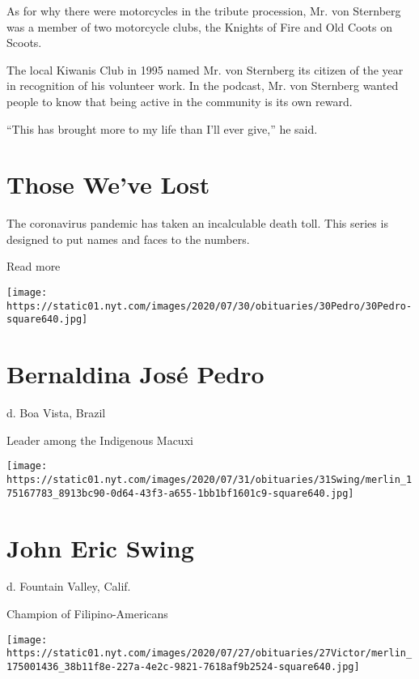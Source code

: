 As for why there were motorcycles in the tribute procession, Mr. von
Sternberg was a member of two motorcycle clubs, the Knights of Fire and
Old Coots on Scoots.

The local Kiwanis Club in 1995 named Mr. von Sternberg its citizen of
the year in recognition of his volunteer work. In the podcast, Mr. von
Sternberg wanted people to know that being active in the community is
its own reward.

``This has brought more to my life than I'll ever give,'' he said.

\href{https://www.nytimes.com/interactive/2020/obituaries/people-died-coronavirus-obituaries.html?action=click\&pgtype=Article\&state=default\&region=BELOW_MAIN_CONTENT\&context=covid_obits_promo}{}

\hypertarget{those-weve-lost}{%
\section{Those We've Lost}\label{those-weve-lost}}

The coronavirus pandemic has taken an incalculable death toll. This
series is designed to put names and faces to the numbers.

Read more

\texttt{[image: https://static01.nyt.com/images/2020/07/30/obituaries/30Pedro/30Pedro-square640.jpg]}

\hypertarget{bernaldina-josuxe9-pedro}{%
\section{Bernaldina José Pedro}\label{bernaldina-josuxe9-pedro}}

d. Boa Vista, Brazil

Leader among the Indigenous Macuxi

\texttt{[image: https://static01.nyt.com/images/2020/07/31/obituaries/31Swing/merlin\_175167783\_8913bc90-0d64-43f3-a655-1bb1bf1601c9-square640.jpg]}

\hypertarget{john-eric-swing}{%
\section{John Eric Swing}\label{john-eric-swing}}

d. Fountain Valley, Calif.

Champion of Filipino-Americans

\texttt{[image: https://static01.nyt.com/images/2020/07/27/obituaries/27Victor/merlin\_175001436\_38b11f8e-227a-4e2c-9821-7618af9b2524-square640.jpg]}

